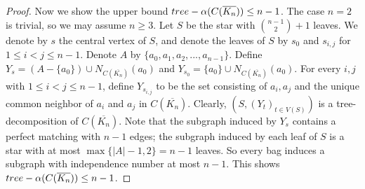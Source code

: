 \documentclass[10pt,a4paper]{amsart}
\newcommand{\T}{\mathcal{T}}
\newcommand{\treea}{{\rm tree}\textnormal{-}\alpha}
\begin{document}
\begin{proof}
    Now we show the upper bound $\treea(C(\overline{K_n})) \leq n-1$.
    The case $n=2$ is trivial, so we may assume $n \geq 3$.
    Let $S$ be the star with $\binom{n-1}{2}+1$ leaves.
    We denote by $s$ the central vertex of $S$, and denote the leaves of $S$ by $s_0$ and $s_{i,j}$ for $1 \leq i <j \leq n-1$.
    Denote $A$ by $\{a_0,a_1,a_2,...,a_{n-1}\}$.
    Define $Y_s = (A-\{a_0\}) \cup N_{C(\overline{K_n})}(a_0)$ and $Y_{s_0} = \{a_0\} \cup N_{C(\overline{K_n})}(a_0)$.
    For every $i,j$ with $1 \leq i <j \leq n-1$, define $Y_{s_{i,j}}$ to be the set consisting of $a_i,a_j$ and the unique common neighbor of $a_i$ and $a_j$ in $C(\overline{K_n})$.
    Clearly, $(S,(Y_t)_{t \in V(S)})$ is a tree-decomposition of $C(\overline{K_n})$.
    Note that the subgraph induced by $Y_s$ contains a perfect matching with $n-1$ edges; the subgraph induced by each leaf of $S$ is a star with at most $\max\{|A|-1,2\} = n-1$ leaves.
    So every bag induces a subgraph with independence number at most $n-1$.
    This shows $\treea(C(\overline{K_n})) \leq n-1$.
%    
%    
%
\end{proof}
\end{document}

